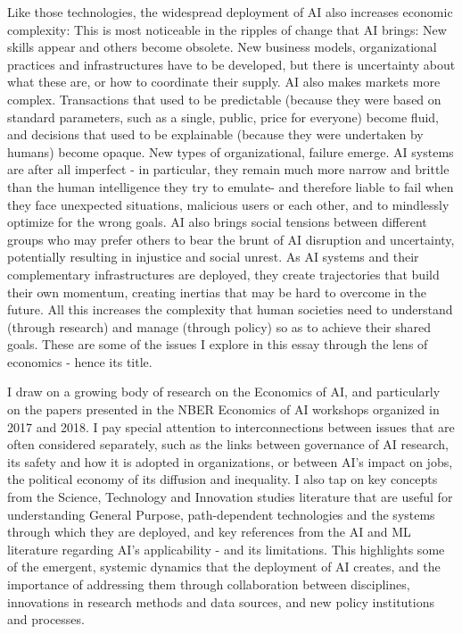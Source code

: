 \documentclass[11pt]{article}
\begin{document}
Like those technologies, the widespread deployment of AI also increases economic complexity: This is most noticeable in the ripples of change that AI brings: New skills appear and others become obsolete. New business models, organizational practices and infrastructures have to be developed, but there is uncertainty about what these are, or how to coordinate their supply. AI also makes markets more complex. Transactions that used to be predictable (because they were based on standard parameters, such as a single, public, price for everyone) become fluid, and decisions that used to be explainable (because they were undertaken by humans) become opaque. New types of organizational, failure emerge.  AI systems are after all imperfect - in particular, they remain much more narrow and brittle than the human intelligence they try to emulate- and therefore liable to fail when they face unexpected situations, malicious users or each other, and to mindlessly optimize for the wrong goals. AI also brings social tensions between different groups who may prefer others to bear the brunt of AI disruption and uncertainty, potentially resulting in injustice and social unrest. As AI systems and their complementary infrastructures are deployed, they create trajectories that build their own momentum, creating inertias that may be hard to overcome in the future. All this increases the complexity that human societies need to understand (through research) and manage (through policy) so as to achieve their shared goals. These are some of the issues I explore in this essay through the lens of economics - hence its title.  

I draw on a growing body of research on the Economics of AI, and particularly on the papers presented in the NBER Economics of AI workshops organized in 2017 and 2018. I pay special attention to  interconnections between issues that are often considered separately, such as the links between governance of AI research, its safety and how it is adopted in organizations, or between AI's impact on jobs,  the political economy of its diffusion and inequality. I also tap on key concepts from the Science, Technology and Innovation studies literature that are useful for understanding General Purpose, path-dependent technologies and the systems through which they are deployed, and key references from the AI and ML literature regarding AI's applicability - and its limitations. This highlights some of the emergent, systemic dynamics that the deployment of AI creates, and the importance of addressing them through collaboration between disciplines, innovations in research methods and data sources, and new policy institutions and processes. 
\end{document}
